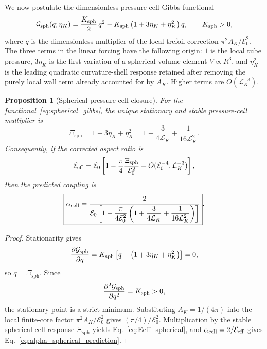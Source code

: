 \documentclass[aps,pra,preprint,longbibliography,nofootinbib]{revtex4-2}
\newtheorem{proposition}{Proposition}
\newcommand{\Et}{\mathcal{E}_0}                    %
\newcommand{\LK}{\mathcal{L}_K}                     %
\newcommand{\AK}{A_K}                                %
\newcommand{\Xsph}{\Xi_{\mathrm{sph}}}             %
\begin{document}
We now postulate the dimensionless pressure-cell Gibbs functional
\begin{equation}
  \mathcal G_{\rm sph}(q;\eta_K)
  = \frac{K_{\rm sph}}{2}\,q^2
    -K_{\rm sph}\left(1+3\eta_K+\eta_K^2\right)q,
  \qquad K_{\rm sph}>0,
  \label{eq:spherical_gibbs}
\end{equation}
where $q$ is the dimensionless multiplier of the local trefoil correction
$\pi^2\AK/\Et^2$.  The three terms in the linear forcing have the following
origin: $1$ is the local tube pressure, $3\eta_K$ is the first variation of
a spherical volume element $V\propto R^3$, and $\eta_K^2$ is the leading
quadratic curvature-shell response retained after removing the purely
local wall term already accounted for by $\AK$.  Higher terms are
$O(\LK^{-3})$.

\begin{proposition}[Spherical pressure-cell closure]
\label{prop:spherical_alpha}
For the functional~\eqref{eq:spherical_gibbs}, the unique stationary and
stable pressure-cell multiplier is
\begin{equation}
  \Xsph=1+3\eta_K+\eta_K^2
       =1+\frac{3}{4\LK}+\frac{1}{16\LK^2}.
  \label{eq:Xi_sph}
\end{equation}
Consequently, if the corrected aspect ratio is
\begin{equation}
  \mathcal E_{\rm eff}
  =\Et\left[1-\frac{\pi}{4}\frac{\Xsph}{\Et^2}
       +O(\Et^{-4},\LK^{-3})\right],
  \label{eq:Eeff_spherical}
\end{equation}
then the predicted coupling is
\begin{equation}
  \boxed{
  \alpha_{\rm cell}
  =\frac{2}{\Et\left[1-\dfrac{\pi}{4\Et^2}
      \left(1+\dfrac{3}{4\LK}+\dfrac{1}{16\LK^2}\right)\right]}
  } .
  \label{eq:alpha_spherical_prediction}
\end{equation}
\end{proposition}

\begin{proof}
Stationarity gives
\begin{equation}
  \frac{\partial \mathcal G_{\rm sph}}{\partial q}
  =K_{\rm sph}\left[q-\left(1+3\eta_K+\eta_K^2\right)\right]=0,
  \label{eq:gibbs_stationarity}
\end{equation}
so $q=\Xsph$.  Since
\begin{equation}
  \frac{\partial^2 \mathcal G_{\rm sph}}{\partial q^2}=K_{\rm sph}>0,
  \label{eq:gibbs_stability}
\end{equation}
the stationary point is a strict minimum.  Substituting
$\AK=1/(4\pi)$ into the local finite-core factor $\pi^2\AK/\Et^2$ gives
$(\pi/4)/\Et^2$.  Multiplication by the stable spherical-cell response
$\Xsph$ yields Eq.~\eqref{eq:Eeff_spherical}, and
$\alpha_{\rm cell}=2/\mathcal E_{\rm eff}$ gives
Eq.~\eqref{eq:alpha_spherical_prediction}.
\end{proof}
\end{document}
